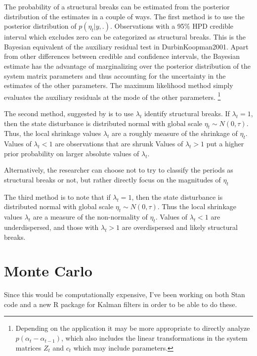 \documentclass{article}
\begin{document}
The probability of a structural breaks can be estimated from the posterior distribution of the estimates in a couple of ways.
The first method is to use the posterior distribution of $p(\eta_{t} | y, .)$.
Observations with a 95\% HPD credible interval which excludes zero can be categorized as structural breaks.
This is the Bayesian equivalent of the auxiliary residual test in \textcite{JongPenzer1998}{DurbinKoopman2001}.%
Apart from other differences between credible and confidence intervals, the Bayesian estimate has the advantage of marginalizing over the posterior distribution of the system matrix parameters and thus accounting for the  uncertainty in the estimates of the other parameters.
The maximum likelihood method simply evaluates the auxiliary residuals at the mode of the other parameters.%
\footnote{Depending on the application it may be more appropriate to directly analyze $p(\alpha_{t} - \alpha_{t-1})$, which also includes the linear transformations in the system matrices $Z_{t}$ and $c_{t}$ which may include parameters.}

The second method, suggested by \textcite[179-180]{PetrisPetroneEtAl2009} is to use $\lambda_{t}$ identify structural breaks.
If $\lambda_{t} = 1$, then the state disturbance is distributed normal with global scale $\eta_{t} \sim N(0, \tau)$.
Thus, the local shrinkage values $\lambda_{t}$ are a roughly measure of the shrinkage of $\eta_{t}$.
Values of $\lambda_{t} < 1$ are observations that are shrunk
Values of $\lambda_{t} > 1$ put a higher prior probability on larger absolute values of $\lambda_{t}$.

Alternatively, the researcher can choose not to try to classify the periods as structural breaks or not, but rather directly focus on the magnitudes of $\eta_{t}$

The third method is to note that if $\lambda_{t} = 1$, then the state disturbance is distributed normal with global scale $\eta_{t} \sim N(0, \tau)$.
Thus the local shrinkage values $\lambda_{t}$ are a measure of the non-normality of $\eta_{t}$.
Values of $\lambda_{t} < 1$ are underdispersed, and those with $\lambda_{t} > 1$ are overdispersed and likely structural breaks.

\section{Monte Carlo}
\label{sec:monte-carlo}

Since this would be computationally expensive, I've been working on both Stan code and a new R package for Kalman filters in order to be able to do these.
\end{document}
